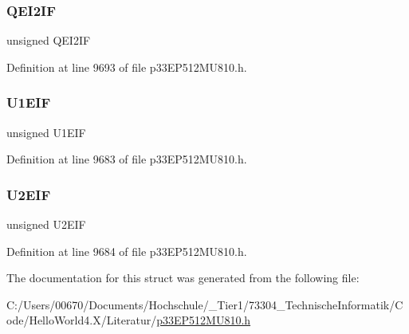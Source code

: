 \subsubsection{\texorpdfstring{Q\+E\+I2\+IF}{QEI2IF}}
{\footnotesize\ttfamily unsigned Q\+E\+I2\+IF}



Definition at line 9693 of file p33\+E\+P512\+M\+U810.\+h.

\mbox{\label{structtag_i_f_s4_b_i_t_s_a87fabcfad76343d2b1c6b9d5e9aab876}} 
\subsubsection{\texorpdfstring{U1\+E\+IF}{U1EIF}}
{\footnotesize\ttfamily unsigned U1\+E\+IF}



Definition at line 9683 of file p33\+E\+P512\+M\+U810.\+h.

\mbox{\label{structtag_i_f_s4_b_i_t_s_a039a139c79e4a59ac9b31b0a29265b9a}} 
\subsubsection{\texorpdfstring{U2\+E\+IF}{U2EIF}}
{\footnotesize\ttfamily unsigned U2\+E\+IF}



Definition at line 9684 of file p33\+E\+P512\+M\+U810.\+h.



The documentation for this struct was generated from the following file\+:\begin{DoxyCompactItemize}
\item 
C\+:/\+Users/00670/\+Documents/\+Hochschule/\+\_\+\+Tier1/73304\+\_\+\+Technische\+Informatik/\+Code/\+Hello\+World4.\+X/\+Literatur/\hyperlink{p33_e_p512_m_u810_8h}{p33\+E\+P512\+M\+U810.\+h}\end{DoxyCompactItemize}
